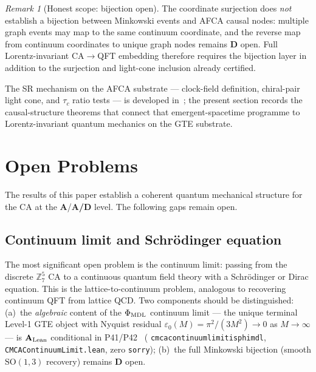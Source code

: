 \documentclass[11pt]{article}
\theoremstyle{remark}
\newtheorem{remark}[theorem]{Remark}
\newcommand{\GTE}{\text{GTE}}
\newcommand{\lean}[1]{%
  \penalty-100
  \begingroup\def\_{\textunderscore\allowbreak}\texttt{#1}\endgroup}
\newcommand{\CatA}{\textbf{A}}
\newcommand{\CatAL}{\ensuremath{\textbf{A}_{\rm Lean}}}
\newcommand{\CatAD}{\textbf{A/D}}
\newcommand{\CatD}{\textbf{D}}
\begin{document}
\begin{remark}[Honest scope: bijection open]
\label{rem:bijection_open}
The coordinate surjection does \emph{not} establish a bijection between
Minkowski events and AFCA causal nodes: multiple graph events may map to
the same continuum coordinate, and the reverse map from continuum
coordinates to unique graph nodes remains \CatD{} open.
Full Lorentz-invariant CA$\to$QFT embedding therefore requires the
bijection layer in addition to the surjection and light-cone inclusion
already certified.
\end{remark}

The SR mechanism on the AFCA substrate --- clock-field definition,
chiral-pair light cone, and $\tau_c$ ratio tests --- is developed
in~\cite{SpivackEmergentGravity}; the present section records the
causal-structure theorems that connect that emergent-spacetime programme
to Lorentz-invariant quantum mechanics on the GTE substrate.

\section{Open Problems}
\label{sec:open}

The results of this paper establish a coherent quantum mechanical
structure for the \GTE{} CA at the \CatA{}/\CatAD{} level.
The following gaps remain open.

\subsection{Continuum limit and Schr\"odinger equation}
\label{ssec:continuum}

The most significant open problem is the continuum limit: passing
from the discrete $\mathbb{Z}_7^5$ CA to a continuous quantum field
theory with a Schr\"odinger or Dirac equation.
This is the lattice-to-continuum problem, analogous to recovering
continuum QFT from lattice QCD.
Two components should be distinguished:
(a)~the \emph{algebraic} content of the $\Phi_{\rm MDL}$ continuum limit ---
the unique terminal Level-1 GTE object with Nyquist residual
$\varepsilon_0(M) = \pi^2/(3M^2) \to 0$ as $M \to \infty$ ---
is \CatAL{} conditional in P41/P42~\cite{SpivackCMCA,SpivackPhiMDLField}
(\lean{cmca\_continuum\_limit\_is\_phimdl}, \lean{CMCAContinuumLimit.lean},
zero \texttt{sorry});
(b)~the full Minkowski bijection (smooth $\mathrm{SO}(1,3)$ recovery)
remains \CatD{} open.
\end{document}

